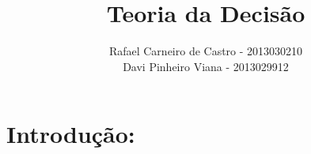 \documentclass[12pt]{elsarticle}
\begin{document}
	\begin{frontmatter}

		\title{Teoria da Decisão\\ }
		\author{Rafael Carneiro de Castro - 2013030210\\
			Davi Pinheiro Viana - 2013029912}
		\address{Minas Gerais, Brasil}
		
	\end{frontmatter}
	
	\section{Introdução:}
	
	
\end{document}
